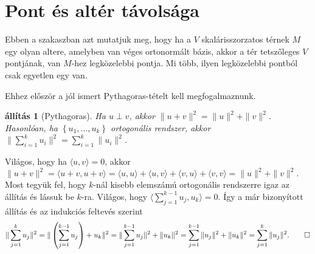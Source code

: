 \documentclass[a4paper, showtrims]{memoir}
\makeatletter
\renewenvironment{proof}[1][\proofname]
    {\par\pushQED{\qed}%
    \normalfont \topsep6\p@\@plus6\p@\relax
    \trivlist
    \item[\hskip\labelsep
        \itshape
    #1\@addpunct{:}]\ignorespaces}
    {\popQED\endtrivlist\@endpefalse}
\theoremstyle{plain}
\newtheorem{proposition}{állítás}[chapter]
\theoremstyle{remark}
\theoremstyle{definition}
\newcommand{\ip}[2]{\langle#1,#2\rangle}
\makeatother
\begin{document}
\section{Pont és altér távolsága}
Ebben a szakaszban azt mutatjuk meg, hogy ha a $V$ skalárisszorzatos térnek $M$ egy olyan
altere, amelyben van véges ortonormált bázis, akkor a tér tetszőleges $V$ pontjának,
van $M$-hez legközelebbi pontja.
Mi több, ilyen legközelebbi pontból csak egyetlen egy van.

Ehhez először a jól ismert Pythagoras-tételt kell megfogalmaznunk.

\begin{proposition}[Pythagoras]
	Ha $u\perp v$, akkor $\|u+v\|^2=\|u\|^2+\|v\|^2$.
	Hasonlóan, ha $\left\{ u_1,\ldots,u_k \right\}$ ortogonális rendszer, akkor
	$\|\sum_{i=1}^ku_i\|^2=\sum_{i=1}^k\|u_i\|^2$.
\end{proposition}
\begin{proof}
	Világos, hogy ha $\ip{u}{v}=0$,
	akkor
	\begin{math}
		\|u+v\|^2
		=
		\ip{u+v}{u+v}
		=\ip{u}{u}+\ip{u}{v}+\ip{v}{u}+\ip{v}{v}
		=
		\|u\|^2+\|v\|^2.
	\end{math}
	Most tegyük fel, hogy $k$-nál kisebb elemszámú ortogonális rendszerre igaz az állítás
	és lássuk be $k$-ra.
	Világos, hogy
	\begin{math}
		\ip{\sum_{j=1}^{k-1}u_j}{u_k}=0.
	\end{math}
	Így a már bizonyított állítás és az indukciós feltevés szerint
	\[
		\|\sum_{j=1}^ku_j\|^2
		=
		\|\left( \sum_{j=1}^{k-1}u_j \right)+u_k\|^2
		=
		\|\sum_{j=1}^{k-1}u_j\|^2+\|u_k\|^2
		=
		\sum_{j=1}^{k-1}\|u_j\|^2+\|u_k\|^2
		=
		\sum_{j=1}^k\|u_j\|^2.
		\qedhere
	\]
\end{proof}
\end{document}
